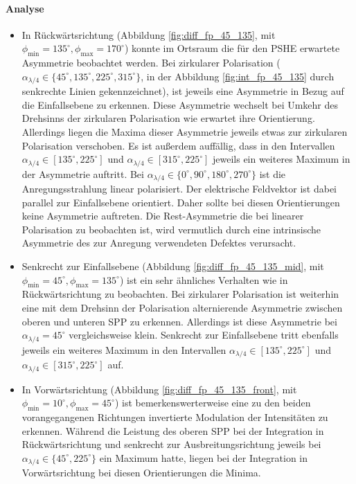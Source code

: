 \documentclass[a4paper, titlepage,  ngerman, fullpage]{book}
\begin{document}
		\paragraph{Analyse}
			\begin{itemize}
				\item In Rückwärtsrichtung (Abbildung \ref{fig:diff_fp_45_135},  mit $\phi_\mathrm{min} =135^\circ, \phi_\mathrm{max}=170^\circ$) konnte im Ortsraum die für den PSHE erwartete Asymmetrie beobachtet werden. Bei zirkularer Polarisation ($\alpha_{\lambda/4} \in \{45^\circ, 135^\circ, 225^\circ, 315^\circ\}$, in der Abbildung \ref{fig:int_fp_45_135} durch senkrechte Linien gekennzeichnet), ist jeweils eine Asymmetrie in Bezug auf die Einfallsebene zu erkennen. Diese Asymmetrie wechselt bei Umkehr des Drehsinns der zirkularen Polarisation wie erwartet ihre Orientierung. Allerdings liegen die Maxima dieser Asymmetrie jeweils etwas zur zirkularen Polarisation verschoben. Es ist außerdem auffällig, dass in den Intervallen $\alpha_{\lambda/4} \in [135^\circ,225^\circ]$ und $\alpha_{\lambda/4} \in [315^\circ, 225^\circ]$ jeweils ein weiteres Maximum in der Asymmetrie auftritt. Bei $\alpha_{\lambda/4} \in \{0^\circ, 90^\circ, 180^\circ, 270^\circ\}$ ist die Anregungsstrahlung linear polarisiert. Der elektrische Feldvektor ist dabei parallel zur Einfallsebene orientiert. Daher sollte bei diesen Orientierungen keine Asymmetrie auftreten. Die Rest-Asymmetrie die bei linearer Polarisation zu beobachten ist, wird vermutlich durch eine intrinsische Asymmetrie des zur Anregung verwendeten Defektes verursacht. 
				\item Senkrecht zur Einfallsebene (Abbildung \ref{fig:diff_fp_45_135_mid},  mit $\phi_\mathrm{min} =45^\circ, \phi_\mathrm{max}=135^\circ$) ist ein sehr ähnliches Verhalten wie in Rückwärtsrichtung zu beobachten. Bei zirkularer Polarisation ist weiterhin eine mit dem Drehsinn der Polarisation alternierende Asymmetrie zwischen oberen und unteren SPP zu erkennen. Allerdings ist diese Asymmetrie bei $\alpha_{\lambda/4}=45^\circ$ vergleichsweise klein. Senkrecht zur Einfallsebene tritt ebenfalls jeweils ein weiteres Maximum in den Intervallen $\alpha_{\lambda/4} \in [135^\circ,225^\circ]$ und $\alpha_{\lambda/4} \in [315^\circ, 225^\circ]$ auf.
				\item
				In Vorwärtsrichtung (Abbildung \ref{fig:diff_fp_45_135_front},  mit  $\phi_\mathrm{min} =10^\circ, \phi_\mathrm{max}=45^\circ$) ist bemerkenswerterweise eine zu den beiden vorangegangenen Richtungen invertierte Modulation der Intensitäten zu erkennen. Während die Leistung des oberen SPP bei der Integration in Rückwärtsrichtung und senkrecht zur Ausbreitungsrichtung jeweils bei $\alpha_{\lambda /4} \in \{45^\circ, 225^\circ\}$ ein Maximum hatte, liegen bei der Integration in Vorwärtsrichtung bei diesen Orientierungen die Minima.
			\end{itemize}
		\FloatBarrier
\end{document}
